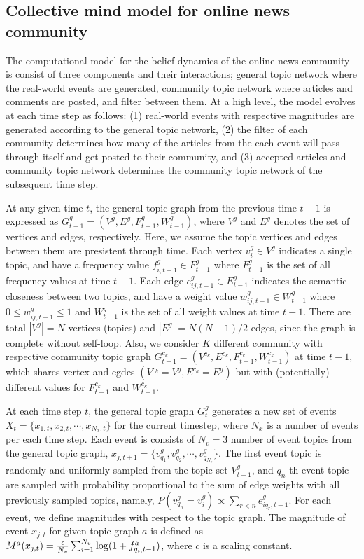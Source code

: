 \documentclass{nature}
\begin{document}
\begin{methods}

\subsection{Collective mind model for online news community}

The computational model for the belief dynamics of the online news community is consist of three components and their interactions; general topic network where the real-world events are generated, community topic network where articles and comments are posted, and filter between them. At a high level, the model evolves at each time step as follows: (1) real-world events with respective magnitudes are generated according to the general topic network, (2) the filter of each community determines how many of the articles from the each event will pass through itself and get posted to their community, and (3) accepted articles and community topic network determines the community topic network of the subsequent time step.

At any given time $t$, the general topic graph from the previous time $t-1$ is expressed as $G^g_{t-1} = (V^g, E^g, F_{t-1}^g, W_{t-1}^g)$, where $V^g$ and $E^g$ denotes the set of vertices and edges, respectively. Here, we assume the topic vertices and edges between them are presistent through time. Each vertex $v_{i}^g \in V^g$ indicates a single topic, and have a frequency value $f_{i,{t-1}}^g \in F_{t-1}^g$ where $F_{t-1}^g$ is the set of all frequency values at time ${t-1}$. Each edge $e_{ij,{t-1}}^g \in E_{t-1}^g$ indicates the semantic closeness between two topics, and have a weight value $w_{ij,{t-1}}^g \in W_{t-1}^g$ where $0 \leq w_{ij,{t-1}}^g \leq 1$ and $W_{t-1}^g$ is the set of all weight values at time ${t-1}$. There are total $|V^g| = N$ vertices (topics) and $|E^g| = N(N-1)/2$ edges, since the graph is complete without self-loop. Also, we consider $K$ different community with respective community topic graph $G^{c_k}_{t-1} = (V^{c_k}, E^{c_k}, F_{t-1}^{c_k}, W_{t-1}^{c_k})$ at time ${t-1}$, which shares vertex and egdes $(V^{c_k} = V^g, E^{c_k} = E^g)$ but with (potentially) different values for $F_{t-1}^{c_k}$ and $W_{t-1}^{c_k}$.

At each time step $t$, the general topic graph $G^g_t$ generates a new set of events $X_{t}=\{x_{1, t}, \allowbreak  x_{2, t}, \cdots, x_{N_x, t}\}$ for the current timestep, where $N_x$ is a number of events per each time step. Each event is consists of $N_{v}=3$ number of event topics from the general topic graph, $x_{j, t+1} = \{v_{q_1}^g, v_{q_2}^g, \cdots, v_{q_{N_{v}}}^g\}$. The first event topic is randomly and uniformly sampled from the topic set $V_{t-1}^g$, and $q_n$-th event topic are sampled with probability proportional to the sum of edge weights with all previously sampled topics, namely, $P(v_{q_n}^g = v_{i}^g) \propto \sum_{r<n} e_{iq_r,{t-1}}^g$. For each event, we define magnitudes with respect to the topic graph. The magnitude of event $x_{j, t}$ for given topic graph $a$ is defined as $M^a(x_{j, t}) = {c \over N_{v}} \sum_{i=1}^{N_{v}} \log(1+f_{q_i,t-1}^a)$, where $c$ is a scaling constant.


\end{methods}
\end{document}
